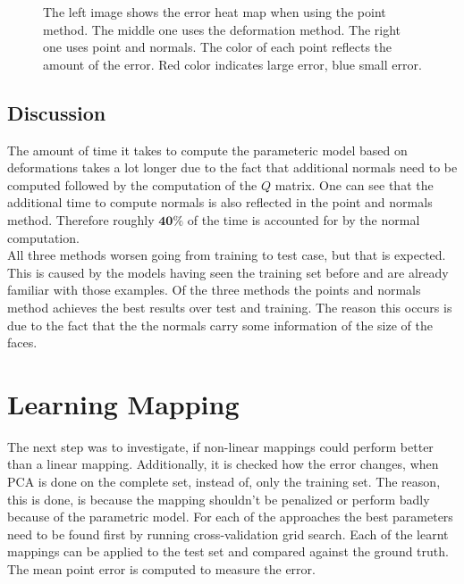 \begin{figure}
\centering
{}
\caption[Input Data for PCA error heat map]{The left image shows the error heat map when using the point method. The middle one uses the deformation method. The right one uses point and normals. The color of each point reflects the amount of the error. Red color indicates large error, blue small error.}
\label{fig:PDNheatmap}
\end{figure}

\subsection{Discussion}
The amount of time it takes to compute the parameteric model based on deformations takes a lot longer due to the fact that additional normals need to be computed followed by the computation of the $Q$ matrix. One can see that the additional time to compute normals is also reflected in the point and normals method. Therefore roughly $\mathbf{40\%}$ of the time is accounted for by the normal computation.\\
All three methods worsen going from training to test case, but that is expected. This is caused by the models having seen the training set before and are already familiar with those examples. Of the three methods the points and normals method achieves the best results over test and training. The reason this occurs is due to the fact that the the normals carry some information of the size of the faces.

\section{Learning Mapping}
The next step was to investigate, if non-linear mappings could perform better than a linear mapping. Additionally, it is checked how the error changes, when PCA is done on the complete set, instead of, only the training set. The reason, this is done, is because the mapping shouldn't be penalized or perform badly because of the parametric model. For each of the approaches the best parameters need to be found first by running cross-validation grid search. Each of the learnt mappings can be applied to the test set and compared against the ground truth. The mean point error is computed to measure the error.

